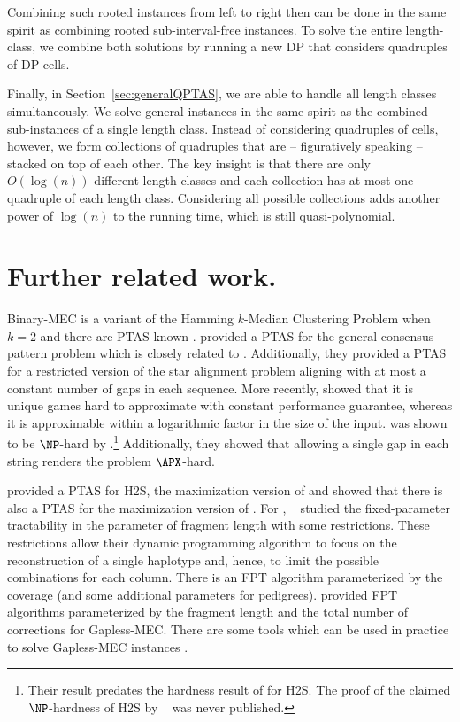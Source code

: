 Combining such rooted instances from left to right then can be done in the same spirit as combining rooted sub-interval-free instances.
To solve the entire length-class, we combine both solutions by running a new DP that considers quadruples of DP cells.

Finally, in Section~\ref{sec:generalQPTAS}, we are able to handle all length classes simultaneously. 
We solve general instances in the same spirit as the combined sub-instances of a single length class.
Instead of considering quadruples of cells, however, we form collections of quadruples that are -- figuratively speaking -- stacked on top of each other.
The key insight is that there are only $O(\log(n))$ different length classes and each collection has at most one quadruple of each length class.
Considering all possible collections adds another power of $\log(n)$ to the running time, which is still quasi-polynomial.

\section{Further related work.}
Binary-MEC is a variant of the Hamming $k$-Median Clustering Problem when $k = 2$ and there are PTAS known \citep{JXL04_k, OR02_polynomial}. 
\cite{LMW02_finding} provided a PTAS for the general consensus pattern problem which is closely related to \MEC.
Additionally, they provided a PTAS for a restricted version of the star alignment problem aligning with at most a constant number of gaps in each sequence.
More recently, \cite{BDK+16_minimum} showed that it is unique games hard to approximate \MEC with constant performance guarantee, whereas it is approximable within a logarithmic factor in the size of the input. 
\GMEC was shown to be $\NP$-hard by \cite{Cilibrasi2007}.\footnote{Their result predates the hardness result of \cite{Fei14_np} for H2S. The proof of the claimed $\NP$-hardness of H2S by ~\cite{KPR98_segmentation} was never published.}
Additionally, they showed that allowing a single gap in each string renders the problem $\APX$-hard.


\cite{AS99_two} provided a PTAS for H2S, the maximization version of \BMEC and \cite{WUB13_monochromatic} showed that there is also a PTAS for the maximization version of \MEC.
For \GMEC, ~\cite{he2010optimal} studied the fixed-parameter tractability in the parameter of fragment length with some restrictions.
These restrictions allow their dynamic programming algorithm to focus on the reconstruction of a single haplotype and, hence, to limit the possible combinations for each column.
There is an FPT algorithm parameterized by the coverage \citep{Patterson2015,garg2016read} (and some additional parameters for pedigrees). 
\cite{BDK+16_minimum} provided FPT algorithms parameterized by the fragment length and the total number of corrections for Gapless-MEC.
There are some tools which can be used in practice to solve Gapless-MEC instances \citep{Pirola2015, Patterson2015}.

